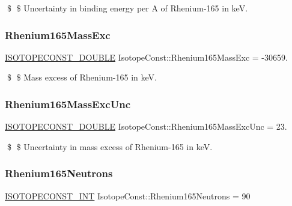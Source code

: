 \$ \$ Uncertainty in binding energy per A of Rhenium-\/165 in keV. \mbox{\label{group___isotope_const-_rhenium-_re165_ga494d75cae9ff72aec58cdf4cf4d76513}} 
\subsubsection{\texorpdfstring{Rhenium165\+Mass\+Exc}{Rhenium165MassExc}}
{\footnotesize\ttfamily \mbox{\hyperlink{group___isotope_const-_macros_ga8f45a7272ce02c0b4c65c44636ed719a}{I\+S\+O\+T\+O\+P\+E\+C\+O\+N\+S\+T\+\_\+\+D\+O\+U\+B\+LE}} Isotope\+Const\+::\+Rhenium165\+Mass\+Exc = -\/30659.}

\$ \$ Mass excess of Rhenium-\/165 in keV. \mbox{\label{group___isotope_const-_rhenium-_re165_gad682c492a3e6275799454bf568748ca3}} 
\subsubsection{\texorpdfstring{Rhenium165\+Mass\+Exc\+Unc}{Rhenium165MassExcUnc}}
{\footnotesize\ttfamily \mbox{\hyperlink{group___isotope_const-_macros_ga8f45a7272ce02c0b4c65c44636ed719a}{I\+S\+O\+T\+O\+P\+E\+C\+O\+N\+S\+T\+\_\+\+D\+O\+U\+B\+LE}} Isotope\+Const\+::\+Rhenium165\+Mass\+Exc\+Unc = 23.}

\$ \$ Uncertainty in mass excess of Rhenium-\/165 in keV. \mbox{\label{group___isotope_const-_rhenium-_re165_ga3667687eb52f6a4777682cb464996914}} 
\subsubsection{\texorpdfstring{Rhenium165\+Neutrons}{Rhenium165Neutrons}}
{\footnotesize\ttfamily \mbox{\hyperlink{group___isotope_const-_macros_ga5f18360b3e99483a35c32d789e62621c}{I\+S\+O\+T\+O\+P\+E\+C\+O\+N\+S\+T\+\_\+\+I\+NT}} Isotope\+Const\+::\+Rhenium165\+Neutrons = 90}

